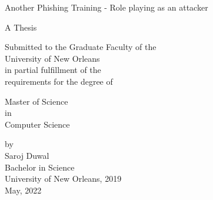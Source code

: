 \providecommand{\tabularnewline}{\\}
\begin{titlepage}
    \begin{center}\large
        Another Phishing Training - Role playing as an attacker
        \vspace{5em}

        A Thesis

        \vspace{5em}

        \begin{singlespace}

            Submitted to the Graduate Faculty of the  \\
            University of New Orleans \\
            in partial fulfillment of the \\
            requirements for the degree of
        \end{singlespace}

        \vspace{5em}
        \begin{singlespace}
            Master of Science \\
            in \\
            Computer Science
        \end{singlespace}

        \vspace{5em}
        \par\end{center}
    \begin{center}\large
        \hspace{12pt} by \\
        \hspace{12pt} Saroj Duwal \\
        \hspace{12pt} Bachelor in Science \\
        \hspace{12pt} University of New Orleans, 2019 \\
        \hspace{12pt} May, 2022\\


        \par\end{center}
\end{titlepage}
\pagebreak{}




